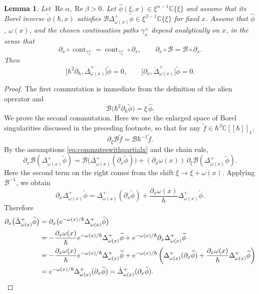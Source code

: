 \documentclass[11pt]{amsart}
\theoremstyle{plain}
\newtheorem{lem}[thm]{Lemma}
\theoremstyle{definition}
\newcommand{\C}{\mathbb{C}}
\DeclareMathOperator{\re}{Re}
\begin{document}
\begin{lem}
\label{lem:pointed-alien-commutation}
Let $\re\alpha,\re\beta>0$. Let
$\widehat\phi(\xi,x)\in \xi^{\alpha-1}\C\{\xi\}$ and
assume that its Borel inverse $\widetilde\phi(\hbar,x)$ satisfies $\mathcal{B}\Delta^+_{\omega(x)}\widetilde\phi
\in
\xi^{\beta-1}\C\{\xi\}$ for fixed $x$. Assume that $\widehat\phi$, $\omega(x)$, and the chosen continuation paths
$\gamma_x^\pm$ depend analytically on $x$, in the sense that
\begin{equation}\label{eq:commuteswithpartialx}
\partial_x\circ \operatorname{cont}_{\gamma_x^\pm}
=
\operatorname{cont}_{\gamma_x^\pm}\circ \partial_x,
\qquad
\partial_x\circ \mathcal{B}
=
\mathcal{B} \circ \partial_x .
\end{equation}
Then
\begin{equation}
\bigl[\hbar^2\partial_\hbar,\dot\Delta_{\omega(x)}^{+}\bigr]\widetilde\phi=0,
\qquad
\bigl[\partial_x,\dot\Delta_{\omega(x)}^{+}\bigr]\widetilde\phi=0.
\end{equation}
\end{lem}


\begin{proof}
The first commutation is immediate from the definition of the alien operator and
\[
\mathcal B\bigl(\hbar^2\partial_\hbar\widetilde\phi\bigr)
=\xi\,\widehat\phi.
\]
We prove the second commutation.  Here we use the enlarged space of
Borel singularities discussed in the preceding footnote, so that for any $\widetilde f \in \hbar^{\beta}\C[[\hbar]]_1$,
\[
\partial_\xi\mathcal B\widetilde f
=
\mathcal{B}\hbar^{-1} \widetilde f.
\]
By the assumptions \eqref{eq:commuteswithpartialx} and the chain rule, 
\[
\partial_x
\mathcal B(\Delta_{\omega(x)}^+\widetilde\phi)
=\mathcal B\bigl(\Delta_{\omega(x)}^+(\partial_x\widetilde\phi)\bigr)
+(\partial_x\omega(x))\,\partial_\xi
\mathcal B(\Delta_{\omega(x)}^+\widetilde\phi).
\]
Here the second term on the right comes from the shift $\xi \to \xi+ \omega(x)$. Applying $\mathcal B^{-1}$, we obtain
\[
\partial_x\Delta_{\omega(x)}^+\widetilde\phi
=\Delta_{\omega(x)}^+(\partial_x\widetilde\phi)
+\frac{\partial_x\omega(x)}{\hbar}\Delta_{\omega(x)}^+\widetilde\phi .
\]
Therefore
\begin{align*}
\partial_x
\bigl(\dot\Delta_{\omega(x)}^+\widetilde\phi\bigr)
&=\partial_x\bigl(e^{-\omega(x)/\hbar}\Delta_{\omega(x)}^+\widetilde\phi\bigr)  \\
&=-\frac{\partial_x\omega(x)}{\hbar}
e^{-\omega(x)/\hbar}
\Delta_{\omega(x)}^+\widetilde\phi
+e^{-\omega(x)/\hbar}
\partial_x\Delta_{\omega(x)}^+\widetilde\phi  \\
&=-\frac{\partial_x\omega(x)}{\hbar}
e^{-\omega(x)/\hbar}
\Delta_{\omega(x)}^+\widetilde\phi
+e^{-\omega(x)/\hbar}\left(\Delta_{\omega(x)}^+(\partial_x\widetilde\phi)
+\frac{\partial_x\omega(x)}{\hbar}
\Delta_{\omega(x)}^+\widetilde\phi
\right)  \\
&=e^{-\omega(x)/\hbar}
\Delta_{\omega(x)}^+(\partial_x\widetilde\phi)
=\dot\Delta_{\omega(x)}^+(\partial_x\widetilde\phi). \qedhere
\end{align*} 
\end{proof}
\end{document}
